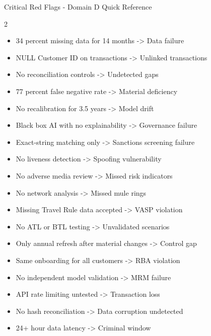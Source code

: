 \documentclass[11pt,a4paper]{beamer}
\begin{document}
	\begin{frame}{Critical Red Flags - Domain D Quick Reference}
		\begin{multicols}{2}
			\begin{itemize}
				\item 34 percent missing data for 14 months -> Data failure
				\item NULL Customer ID on transactions -> Unlinked transactions
				\item No reconciliation controls -> Undetected gaps
				\item 77 percent false negative rate -> Material deficiency
				\item No recalibration for 3.5 years -> Model drift
				\item Black box AI with no explainability -> Governance failure
				\item Exact-string matching only -> Sanctions screening failure
				\item No liveness detection -> Spoofing vulnerability
				\item No adverse media review -> Missed risk indicators
				\item No network analysis -> Missed mule rings
				\item Missing Travel Rule data accepted -> VASP violation
				\item No ATL or BTL testing -> Unvalidated scenarios
				\item Only annual refresh after material changes -> Control gap
				\item Same onboarding for all customers -> RBA violation
				\item No independent model validation -> MRM failure
				\item API rate limiting untested -> Transaction loss
				\item No hash reconciliation -> Data corruption undetected
				\item 24+ hour data latency -> Criminal window
			\end{itemize}
		\end{multicols}
	\end{frame}
	
\end{document}

